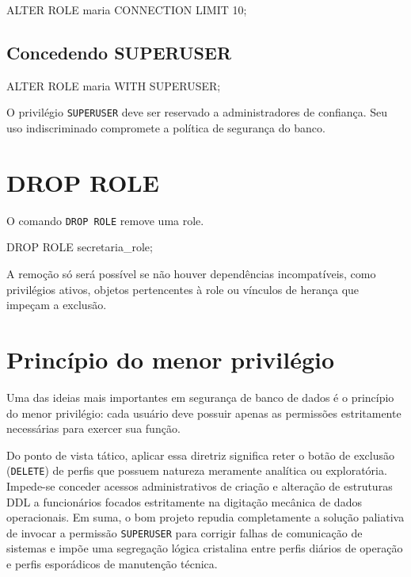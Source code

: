 \begin{sqlcode}
ALTER ROLE maria CONNECTION LIMIT 10;
\end{sqlcode}

\subsection{Concedendo SUPERUSER}

\begin{sqlcode}
ALTER ROLE maria WITH SUPERUSER;
\end{sqlcode}

\begin{danger}
O privilégio \texttt{SUPERUSER} deve ser reservado a administradores de confiança. Seu uso indiscriminado compromete a política de segurança do banco.
\end{danger}

\section{DROP ROLE}

O comando \texttt{DROP ROLE} remove uma role.

\begin{sqlcode}
DROP ROLE secretaria_role;
\end{sqlcode}

A remoção só será possível se não houver dependências incompatíveis, como privilégios ativos, objetos pertencentes à role ou vínculos de herança que impeçam a exclusão.

\section{Princípio do menor privilégio}

Uma das ideias mais importantes em segurança de banco de dados é o princípio do menor privilégio: cada usuário deve possuir apenas as permissões estritamente necessárias para exercer sua função.

Do ponto de vista tático, aplicar essa diretriz significa reter o botão de exclusão (\texttt{DELETE}) de perfis que possuem natureza meramente analítica ou exploratória. Impede-se conceder acessos administrativos de criação e alteração de estruturas DDL a funcionários focados estritamente na digitação mecânica de dados operacionais. Em suma, o bom projeto repudia completamente a solução paliativa de invocar a permissão \texttt{SUPERUSER} para corrigir falhas de comunicação de sistemas e impõe uma segregação lógica cristalina entre perfis diários de operação e perfis esporádicos de manutenção técnica.

